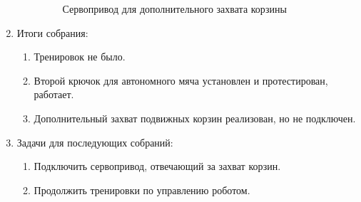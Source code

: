 \begin{enumerate}
\begin{enumerate}
\begin{figure}[H]
\begin{minipage}[h]{0.47\linewidth}
	  	  \end{minipage}
	  	  \caption{Сервопривод для дополнительного захвата корзины}
	   \end{figure}

	\end{enumerate}
	
	\item Итоги собрания:
	\begin{enumerate}
		
		\item Тренировок не было.
		
		\item Второй крючок для автономного мяча установлен и протестирован, работает.
		
        \item Дополнительный захват подвижных корзин реализован, но не подключен.
		
	\end{enumerate}
	
	\item Задачи для последующих собраний:
	\begin{enumerate}
		
		\item Подключить сервопривод, отвечающий за захват корзин.
		
		\item Продолжить тренировки по управлению роботом.
			
	\end{enumerate}
\end{enumerate}
\fillpage

